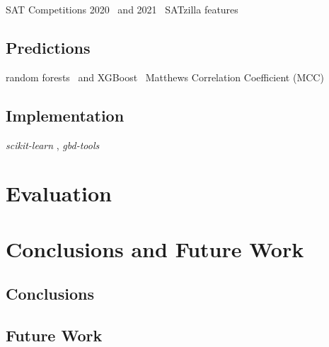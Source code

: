 \documentclass{article}
\begin{document}
SAT Competitions 2020~\cite{balyo2020proceedings} and 2021~\cite{balyo2021proceedings}
SATzilla features~\cite{xu2012features}

\subsection{Predictions}

random forests~\cite{breiman2001random} and XGBoost~\cite{chen2016xgboost}
Matthews Correlation Coefficient (MCC)~\cite{matthews1975comparison, gorodkin2004comparing}

\subsection{Implementation}

\emph{scikit-learn} \cite{pedregosa2011scikit}, \emph{gbd-tools}~\cite{iser2020collaborative}

\section{Evaluation}
\label{sec:evaluation}

\section{Conclusions and Future Work}
\label{sec:conclusion}

\subsection{Conclusions}

\subsection{Future Work}

\printbibliography
\end{document}
